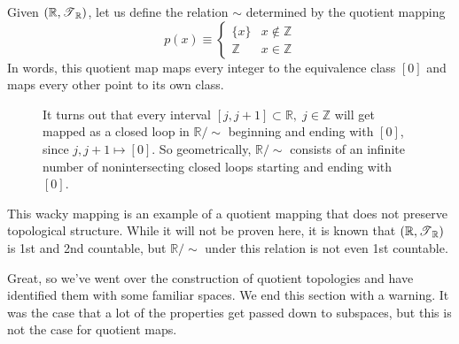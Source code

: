     \begin{example}
      Given $(\mathbb{R}, \T_{\mathbb{R}})$, let us define the relation $\sim$ determined by the quotient mapping 
      \begin{equation}
        p(x) \equiv \begin{cases} \{x\} & x \not\in \mathbb{Z} \\ \mathbb{Z} & x \in \mathbb{Z} \end{cases}
      \end{equation}
      In words, this quotient map maps every integer to the equivalence class $[0]$ and maps every other point to its own class. 

      \begin{figure}[H]
        \centering 
        \caption{It turns out that every interval $[j, j+1] \subset \mathbb{R}, \; j \in \mathbb{Z}$ will get mapped as a closed loop in $\mathbb{R} / \sim$ beginning and ending with $[0]$, since $j, j+1 \mapsto [0]$. So geometrically, $\mathbb{R} / \sim$ consists of an infinite number of nonintersecting closed loops starting and ending with $[0]$. }
        \label{fig:integer}
      \end{figure}

      This wacky mapping is an example of a quotient mapping that does not preserve topological structure. While it will not be proven here, it is known that $(\mathbb{R}, \T_{\mathbb{R}})$ is 1st and 2nd countable, but $\mathbb{R} / \sim$ under this relation is not even 1st countable. 
    \end{example} 

    Great, so we've went over the construction of quotient topologies and have identified them with some familiar spaces. We end this section with a warning. It was the case that a lot of the properties get passed down to subspaces, but this is not the case for quotient maps. 

